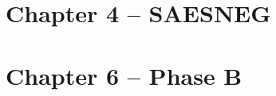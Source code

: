 \documentclass{article}
\begin{document}
\section*{Chapter 4 -- SAESNEG}




\vspace{-1em}




\vspace{-1em}



\vspace{-1em}

\clearpage
\section*{Chapter 6 -- Phase B}


\vspace{-1em}


\vspace{-1em}


\vspace{-1em}



\end{document}
